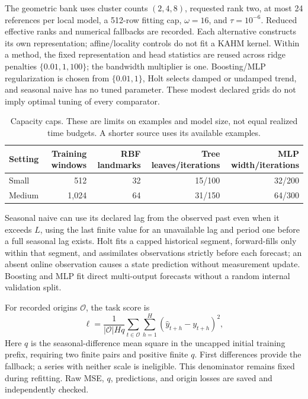 The geometric bank uses cluster counts $(2,4,8)$, requested rank two, at most
24 references per local model, a 512-row fitting cap, $\omega=16$, and
$\tau=10^{-6}$.  Reduced effective ranks and numerical fallbacks are recorded.
Each alternative constructs its own representation; affine/locality controls
do not fit a KAHM kernel.  Within a method, the fixed representation and head
statistics are reused across ridge penalties $\{0.01,1,100\}$; the bandwidth
multiplier is one.  Boosting/MLP regularization is chosen from $\{0.01,1\}$,
Holt selects damped or undamped trend, and seasonal naive has no tuned parameter.
These modest declared grids do not imply optimal tuning of every comparator.

\begin{table}[t]
\caption{Capacity caps.  These are limits on examples and model size, not equal
realized time budgets.  A shorter source uses its available examples.}
\label{tab:nf-capacity}
\centering\small
\setlength{\tabcolsep}{5pt}
\begin{tabular}{@{}lrrrr@{}}
\toprule
Setting & Training windows & RBF landmarks & Tree leaves/iterations & MLP width/iterations \\
\midrule
Small & 512 & 32 & 15/100 & 32/200 \\
Medium & 1,024 & 64 & 31/150 & 64/300 \\
\bottomrule
\end{tabular}
\end{table}

Seasonal naive can use its declared lag from the observed past even when it
exceeds $L$, using the last finite value for an unavailable lag and period one
before a full seasonal lag exists.  Holt fits a capped historical segment,
forward-fills only within that segment, and assimilates observations strictly
before each forecast; an absent online observation causes a state prediction
without measurement update.  Boosting and MLP fit direct multi-output forecasts
without a random internal validation split.

For recorded origins $\mathcal O$, the task score is
\begin{equation}
 \ell=\frac{1}{|\mathcal O|Hq}
       \sum_{t\in\mathcal O}\sum_{h=1}^{H}
       (\widehat y_{t+h}-y_{t+h})^2,
 \label{eq:nf-scaled-loss}
\end{equation}
Here $q$ is the seasonal-difference mean square in the uncapped initial
training prefix, requiring two finite pairs and positive finite $q$.
First differences provide the fallback; a series with neither scale is
ineligible.  This denominator remains fixed during refitting.  Raw MSE,
$q$, predictions, and origin losses are saved and independently checked.

